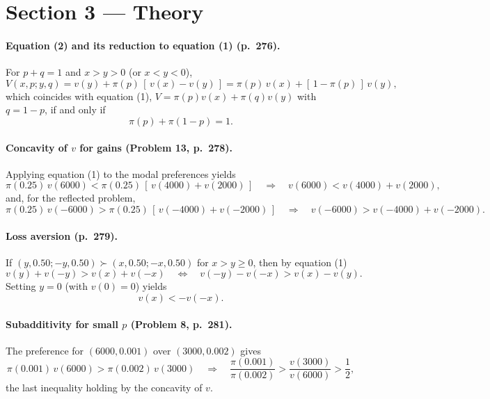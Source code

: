 \documentclass[11pt]{article}
\begin{document}
\section{Section 3 --- Theory}

\paragraph{Equation (2) and its reduction to equation (1) (p.~276).}
For $p+q=1$ and $x>y>0$ (or $x<y<0$),
\begin{equation}\label{eq:eq2-form}
V(x,p;y,q) = v(y) + \pi(p)\,[\,v(x) - v(y)\,]
= \pi(p)\,v(x) + [\,1-\pi(p)\,]\,v(y),
\end{equation}
which coincides with equation (1), $V = \pi(p)v(x) + \pi(q)v(y)$ with $q=1-p$, if and only if
\begin{equation}\label{eq:eq2-reduces}
\pi(p) + \pi(1-p) = 1 .
\end{equation}

\paragraph{Concavity of $v$ for gains (Problem 13, p.~278).}
Applying equation (1) to the modal preferences yields
\begin{equation}\label{eq:p13-concave}
\pi(0.25)\,v(6000) < \pi(0.25)\,[\,v(4000)+v(2000)\,]
\quad\Longrightarrow\quad
v(6000) < v(4000)+v(2000),
\end{equation}
and, for the reflected problem,
\begin{equation}\label{eq:p13-convex}
\pi(0.25)\,v(-6000) > \pi(0.25)\,[\,v(-4000)+v(-2000)\,]
\quad\Longrightarrow\quad
v(-6000) > v(-4000)+v(-2000).
\end{equation}

\paragraph{Loss aversion (p.~279).}
If $(y,0.50;-y,0.50) \succ (x,0.50;-x,0.50)$ for $x>y\ge 0$, then by equation (1)
\begin{equation}\label{eq:lossav}
v(y)+v(-y) > v(x)+v(-x)
\quad\Longleftrightarrow\quad
v(-y)-v(-x) > v(x)-v(y).
\end{equation}
Setting $y=0$ (with $v(0)=0$) yields
\begin{equation}\label{eq:lossav-y0}
v(x) < -v(-x).
\end{equation}

\paragraph{Subadditivity for small $p$ (Problem 8, p.~281).}
The preference for $(6000,0.001)$ over $(3000,0.002)$ gives
\begin{equation}\label{eq:subadd}
\pi(0.001)\,v(6000) > \pi(0.002)\,v(3000)
\quad\Longrightarrow\quad
\frac{\pi(0.001)}{\pi(0.002)} > \frac{v(3000)}{v(6000)} > \frac{1}{2},
\end{equation}
the last inequality holding by the concavity of $v$.
\end{document}
